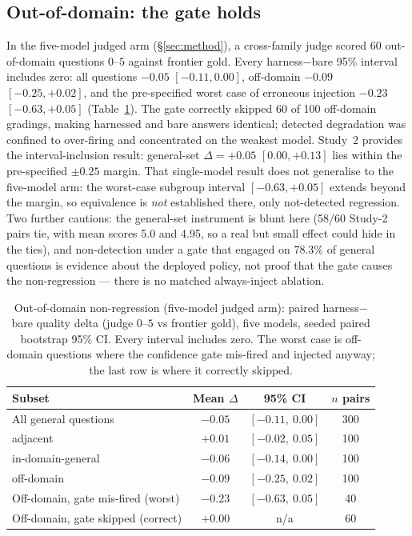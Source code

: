 \documentclass[10pt,twocolumn]{article}
\begin{document}
\subsection{Out-of-domain: the gate holds}\label{sec:ood}
In the five-model judged arm (\S\ref{sec:method}), a cross-family judge scored 60 out-of-domain questions $0$--$5$ against frontier gold. Every harness$-$bare 95\% interval includes zero: all questions $-0.05$ $[-0.11,0.00]$, off-domain $-0.09$ $[-0.25,+0.02]$, and the pre-specified worst case of erroneous injection $-0.23$ $[-0.63,+0.05]$ (Table~\ref{tab:ood}). The gate correctly skipped 60 of 100 off-domain gradings, making harnessed and bare answers identical; detected degradation was confined to over-firing and concentrated on the weakest model. Study~2 provides the interval-inclusion result: general-set $\Delta=+0.05$ $[0.00,+0.13]$ lies within the pre-specified $\pm0.25$ margin. That single-model result does not generalise to the five-model arm: the worst-case subgroup interval $[-0.63,+0.05]$ extends beyond the margin, so equivalence is \emph{not} established there, only not-detected regression. Two further cautions: the general-set instrument is blunt here (58/60 Study-2 pairs tie, with mean scores 5.0 and 4.95, so a real but small effect could hide in the ties), and non-detection under a gate that engaged on 78.3\% of general questions is evidence about the deployed policy, not proof that the gate causes the non-regression --- there is no matched always-inject ablation.

\begin{table}[t]\centering\small
\caption{Out-of-domain non-regression (five-model judged arm): paired harness$-$bare quality delta (judge
$0$--$5$ vs frontier gold), five models, seeded paired bootstrap 95\% CI. Every interval includes
zero. The worst case is off-domain questions where the confidence gate mis-fired and injected anyway;
the last row is where it correctly skipped.}
\label{tab:ood}
\begin{tabular}{lccc}
\toprule
Subset & Mean $\Delta$ & 95\% CI & $n$ pairs \\
\midrule
All general questions              & $-0.05$ & $[-0.11,\ 0.00]$ & 300 \\
\quad adjacent                     & $+0.01$ & $[-0.02,\ 0.05]$ & 100 \\
\quad in-domain-general            & $-0.06$ & $[-0.14,\ 0.00]$ & 100 \\
\quad off-domain                   & $-0.09$ & $[-0.25,\ 0.02]$ & 100 \\
Off-domain, gate mis-fired (worst) & $-0.23$ & $[-0.63,\ 0.05]$ & 40 \\
Off-domain, gate skipped (correct) & $+0.00$ & n/a              & 60 \\
\bottomrule
\end{tabular}
\end{table}
\end{document}
